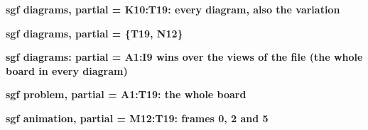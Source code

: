 \documentclass{article}
\newcommand\case[1]{\par\medskip\noindent\textbf{#1}\par\nopagebreak}
\begin{document}

\case{sgf diagrams, partial = K10:T19: every diagram, also the variation}

\case{sgf diagrams, partial = \{T19, N12\}}

\case{sgf diagrams: partial = A1:I9 wins over the views of the file (the whole board in every diagram)}

\case{sgf problem, partial = A1:T19: the whole board}

\case{sgf animation, partial = M12:T19: frames 0, 2 and 5}
\end{document}

